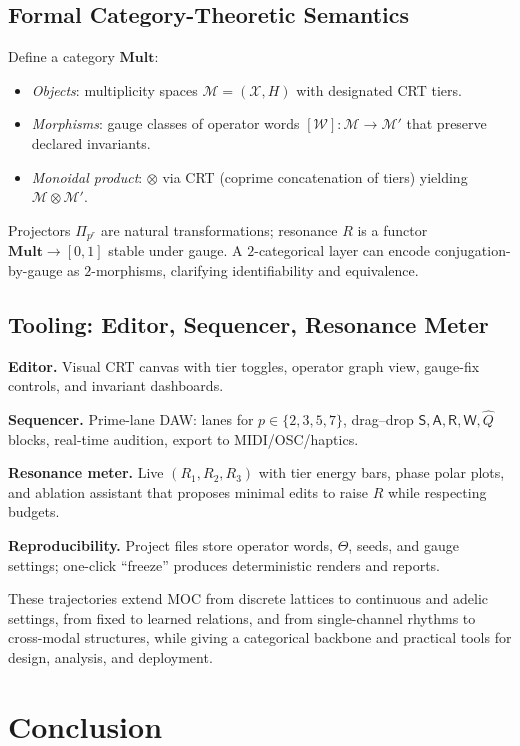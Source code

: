 \documentclass[12pt]{article}
\numberwithin{equation}{section}
\theoremstyle{plain}
\theoremstyle{definition}
\theoremstyle{remark}
\begin{document}
\subsection*{Formal Category-Theoretic Semantics}
Define a category $\mathbf{Mult}$:
\begin{itemize}
  \item \emph{Objects}: multiplicity spaces $\mathcal{M}=(\mathcal{X},H)$ with designated CRT tiers.
  \item \emph{Morphisms}: gauge classes of operator words $[\mathcal{W}]:\mathcal{M}\to\mathcal{M}'$ that preserve declared invariants.
  \item \emph{Monoidal product}: $\otimes$ via CRT (coprime concatenation of tiers) yielding $\mathcal{M}\otimes \mathcal{M}'$.
\end{itemize}
Projectors $\Pi_{p^r}$ are natural transformations; resonance $R$ is a functor $\mathbf{Mult}\to [0,1]$ stable under gauge. A $2$-categorical layer can encode conjugation-by-gauge as $2$-morphisms, clarifying identifiability and equivalence.

\subsection*{Tooling: Editor, Sequencer, Resonance Meter}
\textbf{Editor.} Visual CRT canvas with tier toggles, operator graph view, gauge-fix controls, and invariant dashboards.

\textbf{Sequencer.} Prime-lane DAW: lanes for $p\in\{2,3,5,7\}$, drag–drop $\mathsf{S},\mathsf{A},\mathsf{R},\mathsf{W},\hat{Q}$ blocks, real-time audition, export to MIDI/OSC/haptics.

\textbf{Resonance meter.} Live $(R_1,R_2,R_3)$ with tier energy bars, phase polar plots, and ablation assistant that proposes minimal edits to raise $R$ while respecting budgets.

\textbf{Reproducibility.} Project files store operator words, $\Theta$, seeds, and gauge settings; one-click “freeze” produces deterministic renders and reports.

\medskip
\noindent These trajectories extend MOC from discrete lattices to continuous and adelic settings, from fixed to learned relations, and from single-channel rhythms to cross-modal structures, while giving a categorical backbone and practical tools for design, analysis, and deployment.

\section*{Conclusion}
\end{document}
